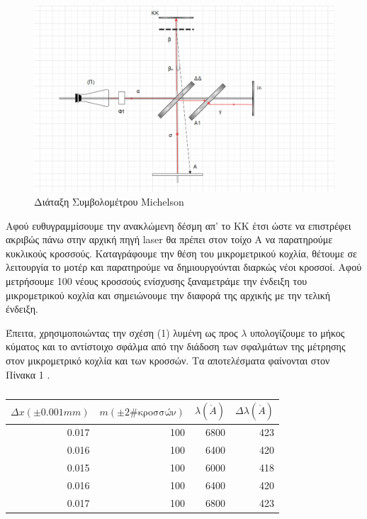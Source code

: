 \documentclass[a4paper]{article}
\begin{document}
\begin{figure}[h!]
\centering
\caption{ Διάταξη Συμβολομέτρου Michelson}
\includegraphics[scale=0.5]{michelson.png}
\end{figure}

Αφού ευθυγραμμίσουμε την ανακλώμενη δέσμη απ' το ΚΚ έτσι ώστε να επιστρέφει ακριβώς πάνω στην αρχική πηγή laser θα πρέπει στον τοίχο Α να παρατηρούμε κυκλικούς κροσσούς. Καταγράφουμε την θέση του μικρομετρικού κοχλία, θέτουμε σε λειτουργία το μοτέρ και παρατηρούμε να δημιουργούνται διαρκώς νέοι κροσσοί. Αφού μετρήσουμε 100 νέους κροσσούς ενίσχυσης ξαναμετράμε την ένδειξη του μικρομετρικού κοχλία και σημειώνουμε την διαφορά της αρχικής με την τελική ένδειξη. 

Έπειτα, χρησιμοποιώντας την σχέση (1) λυμένη ως προς $\lambda$ υπολογίζουμε το μήκος κύματος και το αντίστοιχο σφάλμα από την διάδοση των σφαλμάτων της μέτρησης στον μικρομετρικό κοχλία και των κροσσών.
Τα αποτελέσματα φαίνονται στον Πίνακα 1 .


\newpage


\begin{table}[h!]
\centering
\caption{ }
\begin{tabular}{r|r|r|r}
$\Delta x(\pm0.001mm)$ & $m(\pm2 \#\text{κροσσών})$  & $\lambda (\mathring{A})$ & $\Delta\lambda(\mathring{A})$ \\ 
\hline\hline
0.017 & 100 & 6800 & 423\\ 
0.016 & 100 &	 6400 & 420\\
0.015 & 100 & 6000 & 418\\ 
0.016 & 100 & 6400 & 420\\ 
0.017 & 100 & 6800 & 423\\
\end{tabular}
\end{table}
\end{document}
